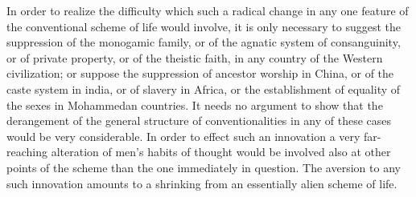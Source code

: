 \documentclass[12pt]{report}
\begin{document}
In order to realize the difficulty which such a radical change in any
one feature of the conventional scheme of life would involve, it is only
necessary to suggest the suppression of the monogamic family, or of
the agnatic system of consanguinity, or of private property, or of the
theistic faith, in any country of the Western civilization; or suppose
the suppression of ancestor worship in China, or of the caste system in
india, or of slavery in Africa, or the establishment of equality of the
sexes in Mohammedan countries. It needs no argument to show that the
derangement of the general structure of conventionalities in any of
these cases would be very considerable. In order to effect such an
innovation a very far-reaching alteration of men's habits of thought
would be involved also at other points of the scheme than the one
immediately in question. The aversion to any such innovation amounts to
a shrinking from an essentially alien scheme of life.
\end{document}
